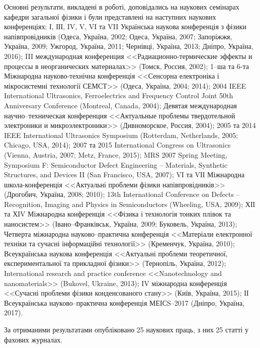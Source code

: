 {\probationTXT}
Основні результати, викладені в роботі, доповідались на наукових семінарах
кафедри загальної фізики \thesisOfOrganization
і були представлені на наступних наукових конференціях:
І, ІІІ, IV, V, VI та VII Українська наукова конференція з фізики напівпровідників
(Одеса, Україна, 2002; Одеса, Україна, 2007; Запоріжжя, Україна, 2009;
Ужгород, Україна, 2011; Чернівці, Україна, 2013; Дніпро, Україна, 2016);
III международная конференция <<Радиационно-термические эффекты и процессы в неорганических материалах>> (Томск, Россия, 2002);
1--ша та 6-та Міжнародна науково-технічна конференція <<Сенсорна електроніка і мікросистемні технології СЕМСТ>> (Одеса, Україна, 2004; 2014);
2004 IEEE International Ultrasonics, Ferroelectrics and Frequency Control Joint 50th Anniversary Conference (Montreal, Canada, 2004);
Девятая международная научно--техническая конференция <<Актуальные проблемы твердотельной электроники и микроэлектроники>> (Дивноморское, Россия, 2004);
2005 та 2014 IEEE International Ultrasonics Symposium (Rotterdam, Netherlands, 2005; Chicago, USA, 2014);
2007 та 2015 International Congress on Ultrasonics (Vienna, Austria, 2007; Metz, France, 2015);
MRS 2007 Spring Meeting, Symposium F: Semiconductor Defect Engineering -- Materials, Synthetic Structures, and Devices II (San Francisco, USA, 2007);
VІ та VІІ Міжнародна школа-конференція <<Актуальні проблеми фізики напівпровідників>> (Дрогобич, Україна, 2008; 2010);
13th International Conference on Defects – Recognition, Imaging and Physics in Semiconductors (Wheeling, USA, 2009);
ХІІ та ХІV Міжнародна конференція <<Фізика і технологія тонких плівок та наносистем>> (Івано--Франківськ, Україна, 2009; Буковель, Україна, 2013);
Четверта міжнародна науково--практична конференція <<Матеріали електронної техніки та сучасні інформаційні технології>> (Кременчук, Україна, 2010);
Всеукраїнська наукова конференція <<Актуальні проблеми теоретичної, експериментальної та прикладної фізики>> (Тернопіль, Україна, 2012);
International research and practice conference <<Nanotechnology and nanomaterials>> (Bukovel, Ukraine, 2013);
IV міжнародна конференція <<Сучасні проблеми фізики конденсованого стану>> (Київ, Україна, 2015);
ІІ Всеукраїнська науково--практична конференція МЕІСS--2017 (Дніпро, Україна, 2017).

{\publicationsTXT}
За отриманими результатами опубліковано 25 наукових праць,
з них 25 статті у фахових журналах.






